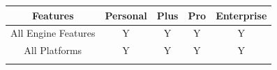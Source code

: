 \documentclass[12pt]{article}
\begin{document}
\begin{longtable}[]{@{}ccccc@{}}
\toprule
\begin{minipage}[b]{0.18\columnwidth}\centering\strut
Features\strut
\end{minipage} & \begin{minipage}[b]{0.18\columnwidth}\centering\strut
Personal\strut
\end{minipage} & \begin{minipage}[b]{0.14\columnwidth}\centering\strut
Plus\strut
\end{minipage} & \begin{minipage}[b]{0.14\columnwidth}\centering\strut
Pro\strut
\end{minipage} & \begin{minipage}[b]{0.23\columnwidth}\centering\strut
Enterprise\strut
\end{minipage}\tabularnewline
\midrule
\endhead
\begin{minipage}[t]{0.18\columnwidth}\centering\strut
All Engine Features\strut
\end{minipage} & \begin{minipage}[t]{0.18\columnwidth}\centering\strut
Y\strut
\end{minipage} & \begin{minipage}[t]{0.14\columnwidth}\centering\strut
Y\strut
\end{minipage} & \begin{minipage}[t]{0.14\columnwidth}\centering\strut
Y\strut
\end{minipage} & \begin{minipage}[t]{0.23\columnwidth}\centering\strut
Y\strut
\end{minipage}\tabularnewline
\begin{minipage}[t]{0.18\columnwidth}\centering\strut
All Platforms\strut
\end{minipage} & \begin{minipage}[t]{0.18\columnwidth}\centering\strut
Y\strut
\end{minipage} & \begin{minipage}[t]{0.14\columnwidth}\centering\strut
Y\strut
\end{minipage} & \begin{minipage}[t]{0.14\columnwidth}\centering\strut
Y\strut
\end{minipage} & \begin{minipage}[t]{0.23\columnwidth}\centering\strut
Y\strut
\end{minipage}\tabularnewline
\begin{minipage}[t]{0.18\columnwidth}\centering\strut

\end{minipage}
\end{longtable}
\end{document}
